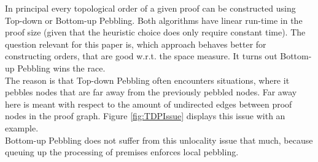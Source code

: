 \documentclass{llncs}
\begin{document}
In principal every topological order of a given proof can be constructed using Top-down or Bottom-up Pebbling.
Both algorithms have linear run-time in the proof size (given that the heuristic choice does only require constant time). 
The question relevant for this paper is, which approach behaves better for constructing orders, that are good w.r.t. the space measure.
It turns out Bottom-up Pebbling wins the race.\\
The reason is that Top-down Pebbling often encounters situations, where it pebbles nodes that are far away from the previously pebbled nodes.
Far away here is meant with respect to the amount of undirected edges between proof nodes in the proof graph. Figure \ref{fig:TDPIssue} displays this issue with an example.\\
Bottom-up Pebbling does not suffer from this unlocality issue that much, because queuing up the processing of premises enforces local pebbling.
\end{document}
